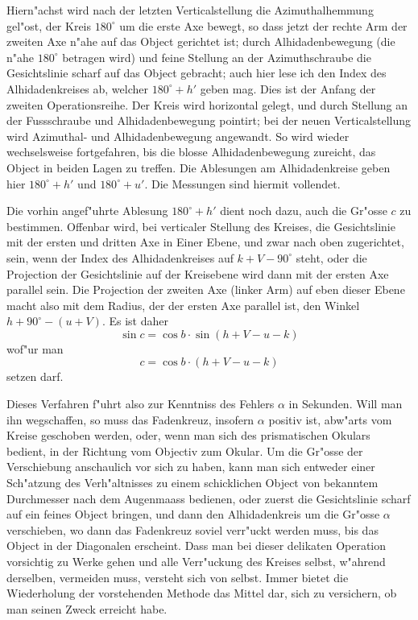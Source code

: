 \documentclass[12pt,a4paper]{article}
\begin{document}
Hiern"achst wird nach der letzten Verticalstellung die Azimuthalhemmung gel"ost, der Kreis $180^{\circ}$
um die erste Axe bewegt, so dass jetzt der rechte Arm der zweiten Axe n"ahe auf das Object gerichtet
ist; durch Alhidadenbewegung (die n"ahe $180^{\circ}$ betragen wird) und feine Stellung an der Azimuthschraube
die Gesichtslinie scharf auf das Object gebracht; auch hier lese ich den Index des Alhidadenkreises ab,
welcher $180^{\circ} + h'$ geben mag. Dies ist der Anfang der zweiten Operationsreihe. Der Kreis wird
horizontal gelegt, und durch Stellung an der Fussschraube und Alhidadenbewegung pointirt; bei der
neuen Verticalstellung wird Azimuthal- und Alhidadenbewegung angewandt. So wird wieder wechselsweise
fortgefahren, bis die blosse Alhidadenbewegung zureicht, das Object in beiden Lagen zu treffen.
Die Ablesungen am Alhidadenkreise geben hier $180^{\circ} + h'$ und $180^{\circ} + u'$. Die Messungen sind hiermit
vollendet.

Die vorhin angef"uhrte Ablesung $180^{\circ} + h'$ dient noch dazu, auch die Gr"osse $c$ zu bestimmen. Offenbar
wird, bei verticaler Stellung des Kreises, die Gesichtslinie mit der ersten und dritten Axe in Einer
Ebene, und zwar nach oben zugerichtet, sein, wenn der Index des Alhidadenkreises auf $k + V - 90^{\circ}$
steht, oder die Projection der Gesichtslinie auf der Kreisebene wird dann mit der ersten Axe parallel sein.
Die Projection der zweiten Axe (linker Arm) auf eben dieser Ebene macht also mit dem Radius, der der
ersten Axe parallel ist, den Winkel $h + 90^{\circ} - (u + V)$. Es ist daher
\[\sin c = \cos b \cdot \sin(h + V - u - k)\]
wof"ur man
\[c = \cos b \cdot (h + V - u - k)\]
setzen darf.

Dieses Verfahren f"uhrt also zur Kenntniss des Fehlers $\alpha$ in Sekunden. Will man ihn wegschaffen,
so muss das Fadenkreuz, insofern $\alpha$ positiv ist, abw"arts vom Kreise geschoben werden, oder, wenn
man sich des prismatischen Okulars bedient, in der Richtung vom Objectiv zum Okular. Um die Gr"osse
der Verschiebung anschaulich vor sich zu haben, kann man sich entweder einer Sch"atzung des Verh"altnisses
zu einem schicklichen Object von bekanntem Durchmesser nach dem Augenmaass bedienen, oder zuerst die
Gesichtslinie scharf auf ein feines Object bringen, und dann den Alhidadenkreis um die Gr"osse $\alpha$
verschieben, wo dann das Fadenkreuz soviel verr"uckt werden muss, bis das Object in der Diagonalen
erscheint. Dass man bei dieser delikaten Operation vorsichtig zu Werke gehen und alle Verr"uckung des
Kreises selbst, w"ahrend derselben, vermeiden muss, versteht sich von selbst. Immer bietet die Wiederholung
der vorstehenden Methode das Mittel dar, sich zu versichern, ob man seinen Zweck erreicht habe.
\end{document}

